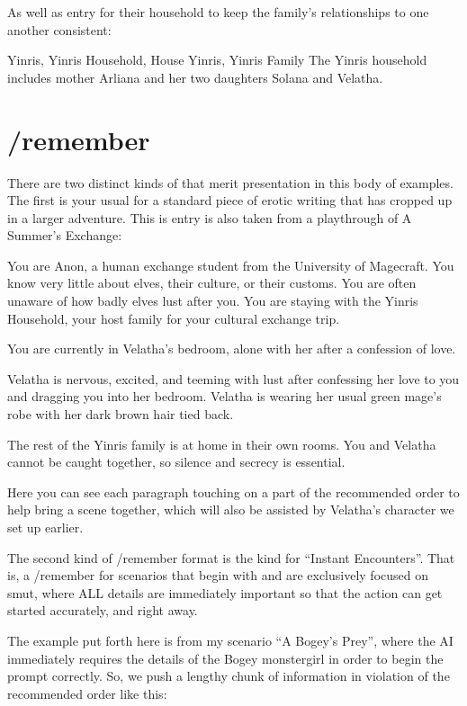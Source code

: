 \documentclass[Coomer-main.tex]{subfiles}
\begin{document}
As well as \wi entry for their household to keep the family’s relationships to one another consistent:

\begin{WI}{Yinris, Yinris Household, House Yinris, Yinris Family}
The Yinris household includes mother Arliana and her two daughters Solana and Velatha.
\end{WI}

\section{/remember}

There are two distinct kinds of \rem that merit presentation in this body of examples. The first is your usual \rem for a standard piece of erotic writing that has cropped up in a larger adventure. This is entry is also taken from a playthrough of A Summer’s Exchange:

\begin{/rm}
You are Anon, a human exchange student from the University of Magecraft. You know very little about elves, their culture, or their customs. You are often unaware of how badly elves lust after you. You are staying with the Yinris Household, your host family for your cultural exchange trip.

You are currently in Velatha’s bedroom, alone with her after a confession of love.

Velatha is nervous, excited, and teeming with lust after confessing her love to you and dragging you into her bedroom. Velatha is wearing her usual green mage’s robe with her dark brown hair tied back.

The rest of the Yinris family is at home in their own rooms. You and Velatha cannot be caught together, so silence and secrecy is essential.
\end{/rm}

Here you can see each paragraph touching on a part of the recommended order to help bring a scene together, which will also be assisted by Velatha’s character \wi we set up earlier.

The second kind of /remember format is the kind for “Instant Encounters”. That is, a /remember for scenarios that begin with and are exclusively focused on smut, where ALL details are immediately important so that the action can get started accurately, and right away.

The example put forth here is from my scenario “A Bogey’s Prey”, where the AI immediately requires the details of the Bogey monstergirl in order to begin the prompt correctly. So, we push a lengthy chunk of information in violation of the recommended order like this:
\end{document}
